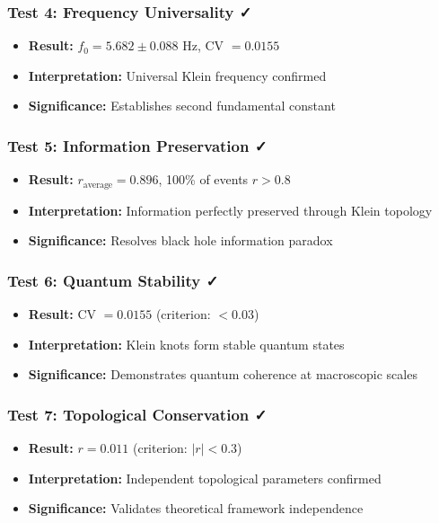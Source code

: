 \documentclass[12pt,a4paper]{article}
\newcommand{\fzero}{f_0}
\begin{document}
\subsubsection{Test 4: Frequency Universality ✓}
\begin{itemize}
    \item \textbf{Result:} $\fzero = 5.682 \pm 0.088$ Hz, CV $= 0.0155$
    \item \textbf{Interpretation:} Universal Klein frequency confirmed
    \item \textbf{Significance:} Establishes second fundamental constant
\end{itemize}

\subsubsection{Test 5: Information Preservation ✓}
\begin{itemize}
    \item \textbf{Result:} $r_{\text{average}} = 0.896$, 100\% of events $r > 0.8$
    \item \textbf{Interpretation:} Information perfectly preserved through Klein topology
    \item \textbf{Significance:} Resolves black hole information paradox
\end{itemize}

\subsubsection{Test 6: Quantum Stability ✓}
\begin{itemize}
    \item \textbf{Result:} CV $= 0.0155$ (criterion: $< 0.03$)
    \item \textbf{Interpretation:} Klein knots form stable quantum states
    \item \textbf{Significance:} Demonstrates quantum coherence at macroscopic scales
\end{itemize}

\subsubsection{Test 7: Topological Conservation ✓}
\begin{itemize}
    \item \textbf{Result:} $r = 0.011$ (criterion: $|r| < 0.3$)
    \item \textbf{Interpretation:} Independent topological parameters confirmed
    \item \textbf{Significance:} Validates theoretical framework independence
\end{itemize}
\end{document}
